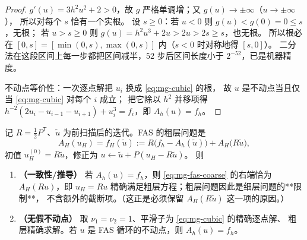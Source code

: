 \begin{proof}
$g'(u)=3h^2u^2+2>0$，故 $g$ 严格单调增；又 $g(u)\to\pm\infty$（$u\to\pm\infty$），
所以对每个 $s$ 恰有一个实根。
设 $s\ge0$：若 $u<0$ 则 $g(u)<g(0)=0\le s$，无根；
若 $u>s\ge0$ 则 $g(u)=h^2u^3+2u>2u>2s\ge s$，也无根。
所以根必在 $[0,s]=[\min(0,s),\max(0,s)]$ 内（$s<0$ 时对称地得 $[s,0]$）。
二分法在这段区间上每一步都把区间减半，$52$ 步后区间长度小于 $2^{-52}$，已是机器精度。

不动点等价性：一次逐点解把 $u_i$ 换成 \eqref{eq:mg-cubic} 的根，
故 $u$ 是不动点当且仅当 \eqref{eq:mg-cubic} 对每个 $i$ 成立；
把它除以 $h^2$ 并移项得
$h^{-2}(2u_i-u_{i-1}-u_{i+1})+u_i^3=f_i$，即 $A_h(u)=f_h$。
\end{proof}

\begin{theorem}
\label{thm:mg-fas}
记 $R=\frac12P^{\mathsf T}$、$\tilde u$ 为前扫描后的迭代。FAS 的粗层问题是
\begin{equation}
  A_H(u_H)=f_H(\tilde u):=R\bigl(f_h-A_h(\tilde u)\bigr)+A_H\bigl(R\tilde u\bigr),
  \label{eq:mg-fas-coarse}
\end{equation}
初值 $u_H^{(0)}=R\tilde u$，修正为 $u\leftarrow\tilde u+P(u_H-R\tilde u)$。
则
\begin{enumerate}
  \item \textbf{（一致性/推导）} 若 $A_h(u)=f_h$，则 \eqref{eq:mg-fas-coarse} 的右端恰为
        $A_H(Ru)$，即 $u_H=Ru$ 精确满足粗层方程；粗层问题因此是细层问题的**限制**，
        不含额外的截断项。（这正是必须保留 $A_H(R\tilde u)$ 这一项的原因。）
  \item \textbf{（无假不动点）} 取 $\nu_1=\nu_2=1$、平滑子为 \eqref{eq:mg-cubic} 的精确逐点解、
        粗层精确求解。若 $u$ 是 FAS 循环的不动点，则 $A_h(u)=f_h$。
\end{enumerate}
\end{theorem}


